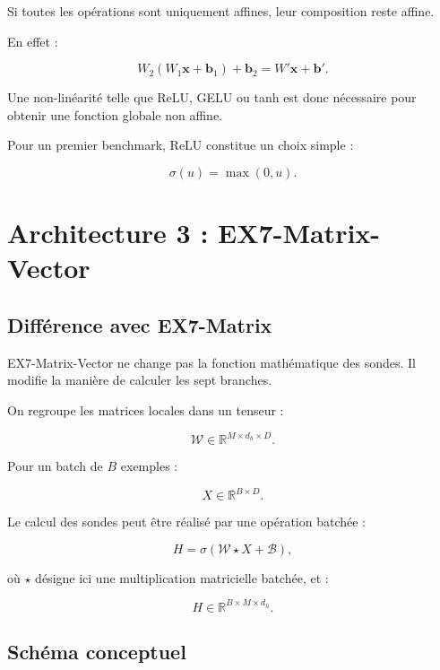 \documentclass[11pt,a4paper]{article}
\begin{document}
Si toutes les opérations sont uniquement affines,
leur composition reste affine.

En effet :

\[
  W_2(W_1\bm{x}+\bm{b}_1)+\bm{b}_2
  =
  W'\bm{x}+\bm{b}'.
\]

Une non-linéarité telle que ReLU, GELU ou tanh est donc
nécessaire pour obtenir une fonction globale non affine.

Pour un premier benchmark, ReLU constitue un choix simple :

\[
  \sigma(u)=\max(0,u).
\]

\section{Architecture 3 : EX7-Matrix-Vector}

\subsection{Différence avec EX7-Matrix}

EX7-Matrix-Vector ne change pas la fonction mathématique
des sondes. Il modifie la manière de calculer les sept branches.

On regroupe les matrices locales dans un tenseur :

\[
  \mathcal{W}
  \in
  \mathbb{R}^{M\times d_h\times D}.
\]

Pour un batch de \(B\) exemples :

\[
  X\in\mathbb{R}^{B\times D}.
\]

Le calcul des sondes peut être réalisé par une opération
batchée :

\[
  H
  =
  \sigma\left(
    \mathcal{W}\star X+\mathcal{B}
  \right),
\]

où \(\star\) désigne ici une multiplication matricielle
batchée, et :

\[
  H\in\mathbb{R}^{B\times M\times d_h}.
\]

\subsection{Schéma conceptuel}
\end{document}
